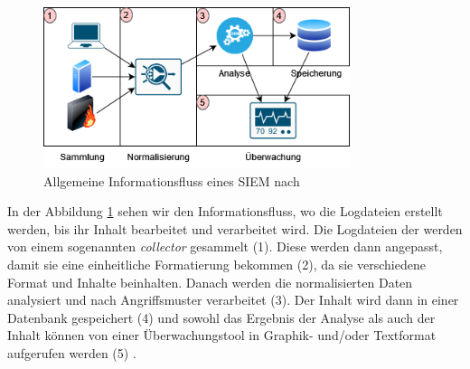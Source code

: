 \begin{figure}[H]
   \centering
   \includegraphics[width=0.8\textwidth]{assets/InfoFluss_SIEM.png}
   \caption[Allgemeine Informationsfluss von \gls{SIEM}]
   {Allgemeine Informationsfluss eines \gls{SIEM} nach \cite{Granadillo_SIEM} }
   \label{fig:SIEM_Allg_Informationsfluss}
   \centering
\end{figure}



In der Abbildung \ref{fig:SIEM_Allg_Informationsfluss} sehen wir den Informationsfluss, wo die Logdateien erstellt werden, bis ihr Inhalt bearbeitet und verarbeitet wird. Die Logdateien der  werden von einem sogenannten \textit{collector} gesammelt (1). Diese werden dann angepasst, damit sie eine einheitliche Formatierung bekommen (2), da sie verschiedene Format und Inhalte beinhalten. Danach werden die normalisierten Daten analysiert und nach Angriffsmuster verarbeitet (3). Der Inhalt wird dann in einer Datenbank gespeichert (4) und sowohl das Ergebnis der Analyse als auch der Inhalt können von einer Überwachungstool in Graphik- und/oder Textformat aufgerufen werden (5) \cite{Granadillo_SIEM}. 





